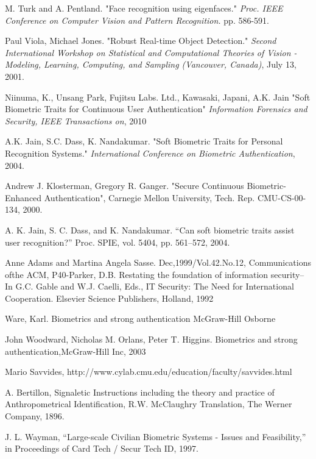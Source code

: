 \begin{thebibliography}{77}
 M. Turk and A. Pentland.
"Face recognition using eigenfaces."
\emph{Proc. IEEE Conference on Computer Vision and Pattern Recognition.} pp. 586-591.

Paul Viola, Michael Jones.
"Robust Real-time Object Detection."
\emph{Second International Workshop on Statistical and Computational Theories of Vision - Modeling, Learning, Computing, and Sampling (Vancouver, Canada)}, July 13, 2001.

 Niinuma, K., Unsang Park, Fujitsu Labs. Ltd., Kawasaki, Japani, A.K. Jain
"Soft Biometric Traits for Continuous User Authentication" 
\emph{Information Forensics and Security, IEEE Transactions on}, 2010

A.K. Jain, S.C. Dass, K. Nandakumar.
"Soft Biometric Traits for Personal Recognition Systems."
\emph{International Conference on Biometric Authentication}, 2004.

Andrew J. Klosterman, Gregory R. Ganger.
"Secure Continuous Biometric-Enhanced Authentication", 
Carnegie Mellon University, Tech. Rep. CMU-CS-00-134, 2000.

A. K. Jain, S. C. Dass, and K. Nandakumar.
“Can soft biometric traits assist user recognition?”
Proc. SPIE, vol. 5404, pp. 561–572, 2004.

Anne Adams and Martina Angela Sasse.
Dec,1999/Vol.42.No.12, Communications ofthe ACM,
P40-Parker, D.B. Restating the foundation of information security-- In G.C.
Gable and W.J. Caelli, Eds., IT Security: The Need for International Cooperation.
Elsevier Science Publishers, Holland, 1992

 Ware, Karl.
Biometrics and strong authentication McGraw-Hill Osborne

John Woodward, Nicholas M. Orlans, Peter T. Higgins.
Biometrics and strong authentication,McGraw-Hill Inc, 2003

Mario Savvides,
http://www.cylab.cmu.edu/education/faculty/savvides.html

A. Bertillon,
Signaletic Instructions including the theory and practice of Anthropometrical Identification, R.W.
McClaughry Translation, The Werner Company, 1896.

J. L. Wayman,
“Large-scale Civilian Biometric Systems - Issues and Feasibility,” in Proceedings of Card Tech /
Secur Tech ID, 1997.


\end{thebibliography}
